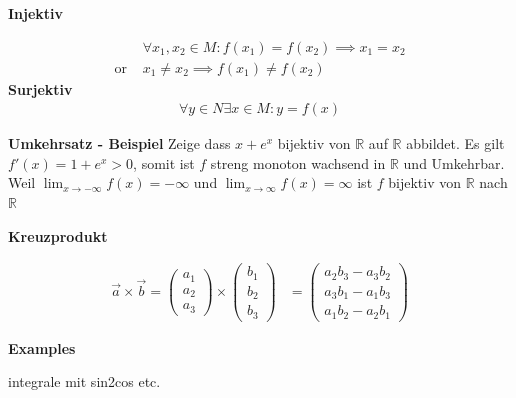 \documentclass[25pt]{sciposter}
\newcommand{\R}{\mathbb{R}}
\newenvironment{method}[1]{\begin{mdframed}[backgroundcolor=blue!10,innertopmargin=15pt, innerbottommargin=15pt, nobreak=true]
		\textbf{#1 }
	}
	{ 
	\end{mdframed}
}
\begin{document}
\begin{multicols}{3}
\begin{method}{Injektiv}
	\begin{align*}
	&\forall x_1,x_2 \in M : f(x_1) = f(x_2) \implies x_1 = x_2\\
	\text{or }  &x_1 \not = x_2 \implies f(x_1) \not = f(x_2)
	\end{align*}
	\textbf{Surjektiv}
	\begin{align*}
	\forall y \in N \exists x \in M : y = f(x)
	\end{align*}
\end{method}

\textbf{Umkehrsatz - Beispiel} Zeige dass $x + e^x$ bijektiv von $\R$ auf $\R$ abbildet. Es gilt $f'(x) = 1 + e^x > 0$, somit ist $f$ streng monoton wachsend in $\R$ und Umkehrbar. Weil $\lim_{x \to -\infty} f(x) = - \infty$ und $\lim_{x \to \infty} f(x) = \infty$ ist $f$ bijektiv von $\R$ nach $\R$



\begin{method}{Kreuzprodukt}
	\begin{align*}
	\vec{a}\times\vec{b}=	\begin{pmatrix}a_1 \\ a_2 \\ a_3\end{pmatrix}
	\times
	\begin{pmatrix}b_1 \\ b_2 \\ b_3 \end{pmatrix} &=	\begin{pmatrix}
	a_2b_3 - a_3b_2 \\
	a_3b_1 - a_1b_3 \\
	a_1b_2 - a_2b_1
	\end{pmatrix}
	\end{align*}
\end{method}

\textbf{Examples}


integrale mit sin2cos etc.
\newpage

\end{multicols}
\end{document}
